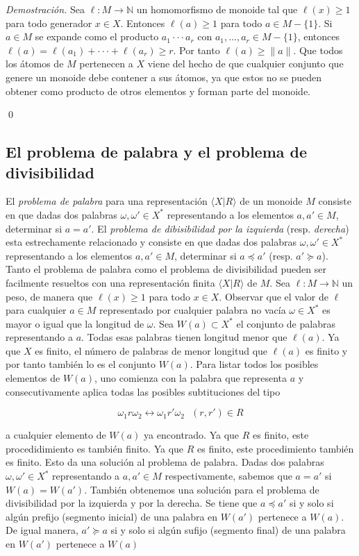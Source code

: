 \documentclass[12pt]{article}
\theoremstyle{definition}
\providecommand{\norm}[1]{\lVert#1\rVert}
\begin{document}
\textit{Demostración.} Sea $\ell: M\rightarrow \mathbb{N}$ un homomorfismo de monoide tal que $\ell(x)\geq 1$ para todo generador $x\in X$. Entonces $\ell(a)\geq 1$ para todo $a\in M-\{1\}$. Si $a\in M$ se expande como el producto $a_1\cdot\cdot\cdot a_r$ con $a_1,...,a_r\in M-\{1\}$, entonces $\ell(a)=\ell(a_1)+\cdot\cdot\cdot+\ell(a_r)\geq r$. Por tanto $\ell(a)\geq \norm{a}$. Que todos los átomos de $M$ pertenecen a $X$ viene del hecho de que cualquier conjunto que genere un monoide debe contener a sus átomos, ya que estos no se pueden obtener como producto de otros elementos y forman parte del monoide.

\qed

\subsection{El problema de palabra y el problema de divisibilidad}

El \textit{problema de palabra} para una representación $\langle X|R\rangle$ de un monoide $M$ consiste en que dadas dos palabras $\omega,\omega'\in X^*$ representando a los elementos $a,a'\in M$, determinar si $a=a'$. El \textit{problema de dibisibilidad por la izquierda} (resp. \textit{derecha}) esta estrechamente relacionado y consiste en que dadas
dos palabras $\omega,\omega'\in X^*$ representando a los elementos $a,a'\in M$, determinar si $a\preceq a'$ (resp. $a'\succeq a$).
\newline
\newline
Tanto el problema de palabra como el problema de divisibilidad pueden ser facilmente resueltos con una representación finita $\langle X|R\rangle$ de $M$. Sea $\ell:M\rightarrow\mathbb{N}$ un peso, de manera que $\ell(x)\geq 1$ para todo $x\in X$. Observar que el valor de $\ell$ para cualquier $a\in M$ representado por cualquier palabra no vacía $\omega\in X^*$ es mayor o igual que la longitud de $\omega$. Sea $W(a)\subset X^*$
 el conjunto de palabras representando a $a$. Todas esas palabras tienen longitud menor que $\ell(a)$. Ya que $X$ es finito, el número de palabras de menor longitud que $\ell(a)$ es finito y por tanto también lo es el conjunto $W(a)$. Para listar todos los posibles elementos de $W(a)$, uno comienza con la palabra que representa $a$ y consecutivamente aplica todas las posibles subtituciones del tipo
 

$$\omega_1 r\omega_2\leftrightarrow \omega_1 r'\omega_2\ \ \ (r,r')\in R$$

a cualquier elemento de $W(a)$ ya encontrado. Ya que $R$ es finito, este procedidimiento es también finito. Ya que $R$ es finito, este procedimiento también es finito. Esto da una solución al problema de palabra. Dadas dos palabras $\omega,\omega'\in X^*$ representando a $a,a'\in M$ respectivamente, sabemos que $a=a'$ si $W(a)=W(a')$. 
\newline
\newline
También obtenemos una solución para el problema de divisibilidad por la izquierda y por la derecha. Se tiene que $a\preceq a'$ si y solo si algún prefijo (segmento inicial) de una palabra en $W(a')$ pertenece a $W(a)$. De igual manera, $a'\succeq a$ si y solo si algún sufijo (segmento final) de una palabra en $W(a')$ pertenece a $W(a)$
\end{document}
